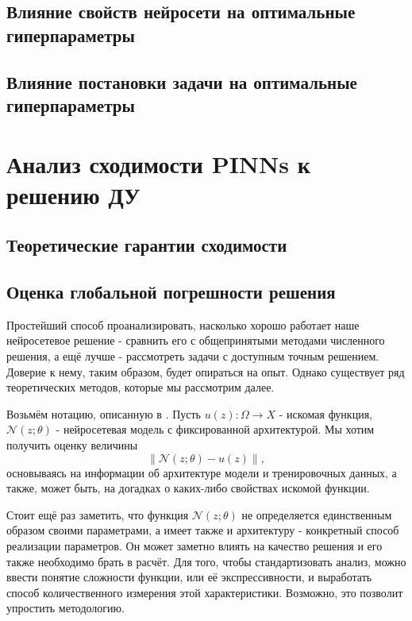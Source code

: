 \documentclass[a4paper, 12pt]{article}
\begin{document}
\subsection{Влияние свойств нейросети на оптимальные гиперпараметры}

\subsection{Влияние постановки задачи на оптимальные гиперпараметры}

\section{Анализ сходимости PINNs к решению ДУ} \label{section:errorAnalysis}

\subsection{Теоретические гарантии сходимости}

\subsection{Оценка глобальной погрешности решения}

Простейший способ проанализировать, насколько хорошо работает наше нейросетевое решение - сравнить его с общепринятыми методами численного решения, а ещё лучше - рассмотреть задачи с доступным точным решением. Доверие к нему, таким образом, будет опираться на опыт. Однако существует ряд теоретических методов, которые мы рассмотрим далее.

Возьмём нотацию, описанную в \cite{Cuomo2022}. Пусть $u(z) : \Omega \to X$ - искомая функция, $\mathcal{N}(z; \theta)$ - нейросетевая модель с фиксированной архитектурой. Мы хотим получить оценку величины
$$
\|\mathcal{N}(z; \theta) - u(z)\|,
$$
основываясь на информации об архитектуре модели и тренировочных данных, а также, может быть, на догадках о каких-либо свойствах искомой функции. 

Стоит ещё раз заметить, что функция $\mathcal{N}(z; \theta)$ не определяется единственным образом своими параметрами, а имеет также и архитектуру - конкретный способ реализации параметров. Он может заметно влиять на качество решения и его также необходимо брать в расчёт. Для того, чтобы стандартизовать анализ, можно ввести понятие сложности функции, или её экспрессивности, и выработать способ количественного измерения этой характеристики. Возможно, это позволит упростить методологию.
\end{document}
